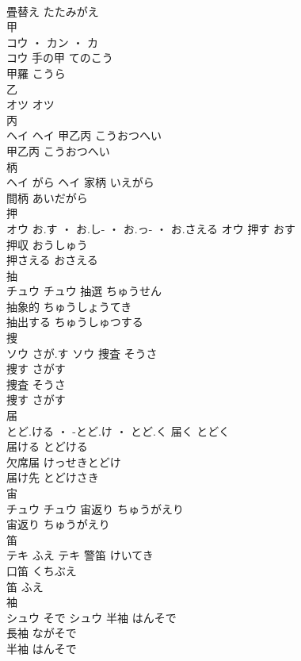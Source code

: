 \documentclass[8pt]{extreport}
\begin{document}
\begin{CJK}{UTF8}{min}
\\	畳替え	たたみがえ	
\\	甲	
\\	コウ ・ カン ・ カ
\\	コウ	手の甲	てのこう	
\\	甲羅	こうら	
\\	乙	
\\	オツ		オツ																																			
\\	丙	
\\	ヘイ		ヘイ	甲乙丙	こうおつへい	
\\	甲乙丙	こうおつへい	
\\	柄	
\\	ヘイ	がら	ヘイ	家柄	いえがら	
\\	間柄	あいだがら	
\\	押	
\\	オウ	お.す ・ お.し- ・ お.っ- ・ お.さえる	オウ	押す	おす	
\\	押収	おうしゅう	
\\	押さえる	おさえる	
\\	抽	
\\	チュウ		チュウ	抽選	ちゅうせん	
\\	抽象的	ちゅうしょうてき	
\\	抽出する	ちゅうしゅつする	
\\	捜	
\\	ソウ	さが.す	ソウ	捜査	そうさ	
\\	捜す	さがす	
\\	捜査	そうさ	
\\	捜す	さがす	
\\	届	
\\	とど.ける ・ -とど.け ・ とど.く		届く	とどく	
\\	届ける	とどける	
\\	欠席届	けっせきとどけ	
\\	届け先	とどけさき	
\\	宙	
\\	チュウ		チュウ	宙返り	ちゅうがえり	
\\	宙返り	ちゅうがえり	
\\	笛	
\\	テキ	ふえ	テキ	警笛	けいてき	
\\	口笛	くちぶえ	
\\	笛	ふえ	
\\	袖	
\\	シュウ	そで	シュウ	半袖	はんそで	
\\	長袖	ながそで	
\\	半袖	はんそで	

\end{CJK}
\end{document}
